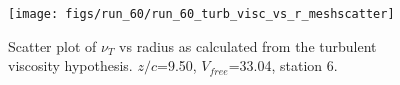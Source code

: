 \begin{figure}[H]
\centering
\texttt{[image: figs/run\_60/run\_60\_turb\_visc\_vs\_r\_meshscatter]}
\caption{Scatter plot of $\nu_T$ vs radius as calculated from the turbulent viscosity hypothesis. $z/c$=9.50, $V_{free}$=33.04, station 6.}
\label{fig:run_60_turb_visc_vs_r_meshscatter}
\end{figure}



